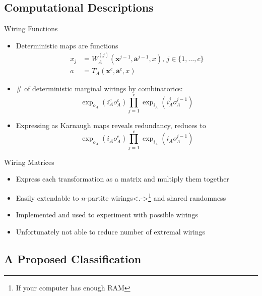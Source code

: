 \documentclass[xcolor=dvipsnames]{beamer}
\newcommand{\dintv}[2]{\mathopen\{#1,\ldots,#2\mathclose\}}
\newcommand{\?}{\mathrel{?}} %
\newcommand{\cvec}[1]{\boldsymbol{\mathbf{#1}}}    %
\begin{document}
\subsection{Computational Descriptions}

\begin{frame}{Wiring Functions}
  \begin{itemize}[<+->]
    \item Deterministic maps are functions
      \begin{align*}
        x_j &= W^{(j)}_{A}(\cvec{x}^{j-1}, \cvec{a}^{j-1}, x),\,j \in \dintv{1}{c} \\
          a &= T_{A}(\cvec{x}^{c}, \cvec{a}^{c}, x)
      \end{align*}
    \item \(\#\) of deterministic marginal wirings by combinatorics:
      \[ \exp_{o_A}(i_A^c o_A^c) \prod_{j=1}^c \exp_{i_A}(i_A^{j} o_A^{j-1}) \]
    \item Expressing as Karnaugh maps reveals redundancy, reduces to
      \[ \exp_{o_A}(i_A o_A^c) \prod_{j=1}^c \exp_{i_A}(i_A o_A^{j-1}) \]
  \end{itemize}
\end{frame}


\begin{frame}{Wiring Matrices}
  \begin{itemize}[<+->]
    \item Express each transformation as a matrix and multiply them together
    \item Easily extendable to \(n\)-partite wirings\only<.->{\footnote{If your computer has enough RAM}} and shared randomness
    \item Implemented and used to experiment with possible wirings
    \item Unfortunately not able to reduce number of extremal wirings
  \end{itemize}
\end{frame}

\subsection{A Proposed Classification}
\end{document}
